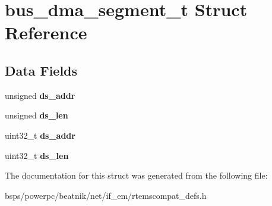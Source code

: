 \hypertarget{structbus__dma__segment__t}{}\section{bus\+\_\+dma\+\_\+segment\+\_\+t Struct Reference}
\label{structbus__dma__segment__t}
\subsection*{Data Fields}
\begin{DoxyCompactItemize}
\item 
\mbox{\label{structbus__dma__segment__t_af5e3e88b70cc5acc9ec7b2e567c70c7a}} 
unsigned {\bfseries ds\+\_\+addr}
\item 
\mbox{\label{structbus__dma__segment__t_acba11fee0447aca915deb2d80fc91622}} 
unsigned {\bfseries ds\+\_\+len}
\item 
\mbox{\label{structbus__dma__segment__t_a4e372ee85533df794e8131914820a693}} 
uint32\+\_\+t {\bfseries ds\+\_\+addr}
\item 
\mbox{\label{structbus__dma__segment__t_ab71dc191eb38bb6a103aa69594122bb5}} 
uint32\+\_\+t {\bfseries ds\+\_\+len}
\end{DoxyCompactItemize}


The documentation for this struct was generated from the following file\+:\begin{DoxyCompactItemize}
\item 
bsps/powerpc/beatnik/net/if\+\_\+em/rtemscompat\+\_\+defs.\+h\end{DoxyCompactItemize}
